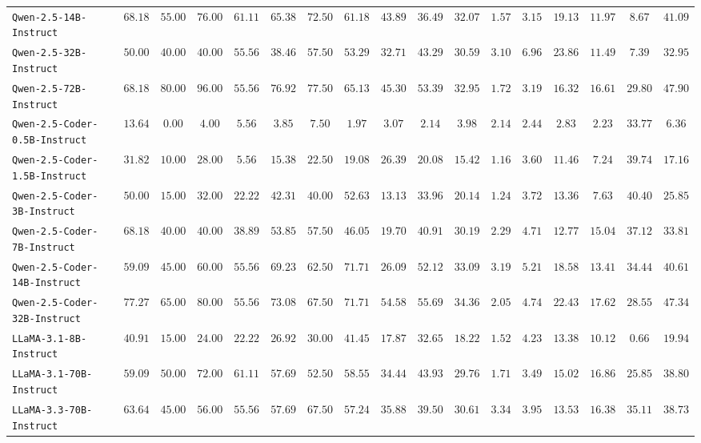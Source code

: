 \begin{table*}[]
{\begin{tabular}{lcccccccccccccccc}
\texttt{Qwen-2.5-14B-Instruct} & $68.18$ & $55.00$ & $76.00$ & $61.11$ & $65.38$ & $72.50$ & $61.18$ & $43.89$ & $36.49$ & $32.07$ & $1.57$ & $3.15$ & $19.13$ & $11.97$ & $8.67$ & $41.09$ \\
\texttt{Qwen-2.5-32B-Instruct} & $50.00$ & $40.00$ & $40.00$ & $55.56$ & $38.46$ & $57.50$ & $53.29$ & $32.71$ & $43.29$ & $30.59$ & $3.10$ & $6.96$ & $23.86$ & $11.49$ & $7.39$ & $32.95$ \\
\texttt{Qwen-2.5-72B-Instruct} & $68.18$ & $80.00$ & $96.00$ & $55.56$ & $76.92$ & $77.50$ & $65.13$ & $45.30$ & $53.39$ & $32.95$ & $1.72$ & $3.19$ & $16.32$ & $16.61$ & $29.80$ & $47.90$ \\
\texttt{Qwen-2.5-Coder-0.5B-Instruct} & $13.64$ & $0.00$ & $4.00$ & $5.56$ & $3.85$ & $7.50$ & $1.97$ & $3.07$ & $2.14$ & $3.98$ & $2.14$ & $2.44$ & $2.83$ & $2.23$ & $33.77$ & $6.36$ \\
\texttt{Qwen-2.5-Coder-1.5B-Instruct} & $31.82$ & $10.00$ & $28.00$ & $5.56$ & $15.38$ & $22.50$ & $19.08$ & $26.39$ & $20.08$ & $15.42$ & $1.16$ & $3.60$ & $11.46$ & $7.24$ & $39.74$ & $17.16$ \\
\texttt{Qwen-2.5-Coder-3B-Instruct} & $50.00$ & $15.00$ & $32.00$ & $22.22$ & $42.31$ & $40.00$ & $52.63$ & $13.13$ & $33.96$ & $20.14$ & $1.24$ & $3.72$ & $13.36$ & $7.63$ & $40.40$ & $25.85$ \\
\texttt{Qwen-2.5-Coder-7B-Instruct} & $68.18$ & $40.00$ & $40.00$ & $38.89$ & $53.85$ & $57.50$ & $46.05$ & $19.70$ & $40.91$ & $30.19$ & $2.29$ & $4.71$ & $12.77$ & $15.04$ & $37.12$ & $33.81$ \\
\texttt{Qwen-2.5-Coder-14B-Instruct} & $59.09$ & $45.00$ & $60.00$ & $55.56$ & $69.23$ & $62.50$ & $71.71$ & $26.09$ & $52.12$ & $33.09$ & $3.19$ & $5.21$ & $18.58$ & $13.41$ & $34.44$ & $40.61$ \\
\texttt{Qwen-2.5-Coder-32B-Instruct} & $77.27$ & $65.00$ & $80.00$ & $55.56$ & $73.08$ & $67.50$ & $71.71$ & $54.58$ & $55.69$ & $34.36$ & $2.05$ & $4.74$ & $22.43$ & $17.62$ & $28.55$ & $47.34$ \\
\texttt{LLaMA-3.1-8B-Instruct} & $40.91$ & $15.00$ & $24.00$ & $22.22$ & $26.92$ & $30.00$ & $41.45$ & $17.87$ & $32.65$ & $18.22$ & $1.52$ & $4.23$ & $13.38$ & $10.12$ & $0.66$ & $19.94$ \\
\texttt{LLaMA-3.1-70B-Instruct} & $59.09$ & $50.00$ & $72.00$ & $61.11$ & $57.69$ & $52.50$ & $58.55$ & $34.44$ & $43.93$ & $29.76$ & $1.71$ & $3.49$ & $15.02$ & $16.86$ & $25.85$ & $38.80$ \\
\texttt{LLaMA-3.3-70B-Instruct} & $63.64$ & $45.00$ & $56.00$ & $55.56$ & $57.69$ & $67.50$ & $57.24$ & $35.88$ & $39.50$ & $30.61$ & $3.34$ & $3.95$ & $13.53$ & $16.38$ & $35.11$ & $38.73$ \\

\end{tabular}}
\end{table*}

